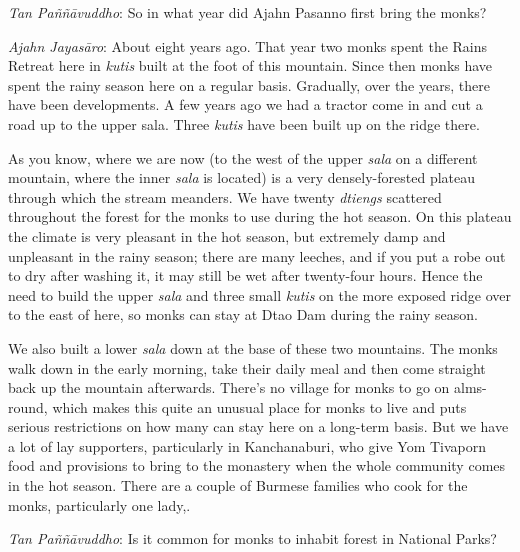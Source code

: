 \emph{Tan Paññāvuddho}: So in what year did Ajahn Pasanno first bring
the monks? 

\emph{Ajahn Jayasāro}: About eight years ago. That year two monks spent
the Rains Retreat here in \emph{kutis} built at the foot of this
mountain. Since then monks have spent the rainy season here on a regular
basis. Gradually, over the years, there have been developments. A few
years ago we had a tractor come in and cut a road up to the upper sala. 
Three \emph{kutis} have been built up on the ridge there. 

As you know, where we are now (to the west of the upper \emph{sala} on a
different mountain, where the inner \emph{sala} is located) is a very
densely-forested plateau through which the stream meanders. We have
twenty \emph{dtiengs} scattered throughout the forest for the monks to
use during the hot season. On this plateau the climate is very pleasant
in the hot season, but extremely damp and unpleasant in the rainy
season; there are many leeches, and if you put a robe out to dry after
washing it, it may still be wet after twenty-four hours. Hence the need
to build the upper \emph{sala} and three small \emph{kutis} on the more
exposed ridge over to the east of here, so monks can stay at Dtao Dam
during the rainy season. 

We also built a lower \emph{sala} down at the base of these two
mountains. The monks walk down in the early morning, take their daily
meal and then come straight back up the mountain afterwards. There's no
village for monks to go on alms-round, which makes this quite an unusual
place for monks to live and puts serious restrictions on how many can
stay here on a long-term basis. But we have a lot of lay supporters, 
particularly in Kanchanaburi, who give Yom Tivaporn food and provisions
to bring to the monastery when the whole community comes in the hot
season. There are a couple of Burmese families who cook for the monks, 
particularly one lady,. 

\emph{Tan Paññāvuddho}: Is it common for monks to inhabit forest in
National Parks? 

